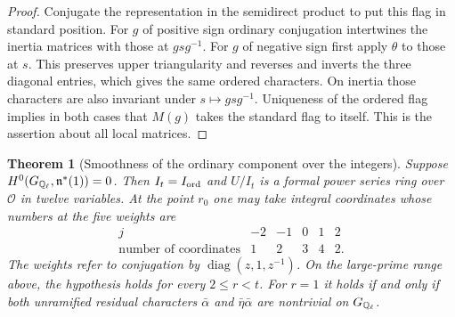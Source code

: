 \documentclass[a4paper,11pt]{article}
\newtheorem{theorem}[proposition]{Theorem}
\theoremstyle{definition}
\theoremstyle{remark}
\numberwithin{equation}{section}
\newcommand{\OO}{\mathcal O}
\begin{document}
\begin{proof}
Conjugate the representation in the semidirect product to put this
flag in standard position. For \(g\) of positive sign ordinary
conjugation intertwines the inertia matrices with those at
\(gsg^{-1}\). For \(g\) of negative sign first apply \(\theta\)
to those at \(s\). This preserves upper triangularity and
reverses and inverts the three diagonal entries, which gives
the same ordered characters. On inertia those characters are
also invariant under \(s\mapsto gsg^{-1}\). Uniqueness of the
ordered flag implies in both cases that \(M(g)\) takes the
standard flag to itself. This is the assertion about all local
matrices.
\end{proof}

\begin{theorem}[Smoothness of the ordinary component over the integers]\label{thm:smooth69}
Suppose \(H^0(G_{\mathbb Q_\ell},\mathfrak n^*(1))=0\). Then
\(I_t=I_{\rm ord}\) and \(U/I_t\) is a formal power series
ring over \(\OO\) in twelve variables. At the point \(r_0\)
one may take integral coordinates whose numbers at the five
weights are
\[
\begin{array}{c|rrrrr}
        j&-2&-1&0&1&2\\ \hline
   \text{number of coordinates}&1&2&3&4&2 .
\end{array}
\]
The weights refer to conjugation by
\(\operatorname{diag}(z,1,z^{-1})\). On the large-prime range
above, the hypothesis holds for every \(2\le r<t\).
For \(r=1\) it holds if and only if both unramified residual
characters \(\bar\alpha\) and \(\bar\eta\bar\alpha\)
are nontrivial on \(G_{\mathbb Q_\ell}\).
\end{theorem}
\end{document}
